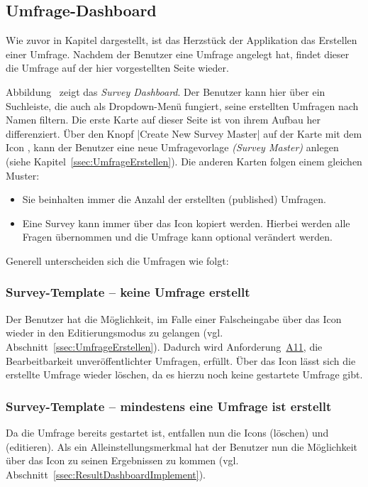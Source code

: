 \subsection{Umfrage-Dashboard}
\label{ssec:UmfrageDashboard}

Wie zuvor in Kapitel  dargestellt, ist das Herzstück der Applikation das Erstellen einer Umfrage.
Nachdem der Benutzer eine Umfrage  angelegt hat, findet dieser die Umfrage auf der hier vorgestellten Seite wieder.

Abbildung~ zeigt das \emph{Survey Dashboard}.
Der Benutzer kann hier über ein Suchleiste, die auch als Dropdown-Menü fungiert, seine erstellten Umfragen nach Namen filtern. \newline
Die erste Karte auf dieser Seite ist von ihrem Aufbau her differenziert.
Über den Knopf \jinline|Create New Survey Master| auf der Karte mit dem Icon \faPlusSquare, kann der Benutzer eine neue Umfragevorlage \emph{(Survey Master)} anlegen (siehe Kapitel~\vref{ssec:UmfrageErstellen}). \newline
Die anderen Karten folgen einem gleichen Muster:
%
\begin{itemize}
	\item Sie beinhalten immer die Anzahl der erstellten (published) Umfragen.
	\item Eine Survey kann immer über das Icon \faCopy\xspace kopiert werden.
	Hierbei werden alle Fragen übernommen und die Umfrage kann optional verändert werden.
\end{itemize}
%
Generell unterscheiden sich die Umfragen wie folgt:
%
\subsubsection*{Survey-Template -- keine Umfrage erstellt}
%
Der Benutzer hat die Möglichkeit, im Falle einer Falscheingabe über das Icon \faEdit\xspace wieder in den Editierungsmodus zu gelangen (vgl. Abschnitt~\vref{ssec:UmfrageErstellen}).
Dadurch wird Anforderung~\hyperref[Anf:A11]{A11}, die Bearbeitbarkeit unveröffentlichter Umfragen, erfüllt.
Über das Icon \faTrash\xspace lässt sich die erstellte Umfrage wieder löschen, da es hierzu noch keine gestartete Umfrage gibt.

\subsubsection*{Survey-Template -- mindestens eine Umfrage ist erstellt}
%
Da die Umfrage bereits gestartet ist, entfallen nun die Icons \faTrash\xspace (löschen) und \faEdit\xspace (editieren).
Als ein Alleinstellungsmerkmal hat der Benutzer nun die Möglichkeit über das Icon \faIdCard\xspace zu seinen Ergebnissen zu kommen (vgl. Abschnitt~\vref{ssec:ResultDashboardImplement}).

